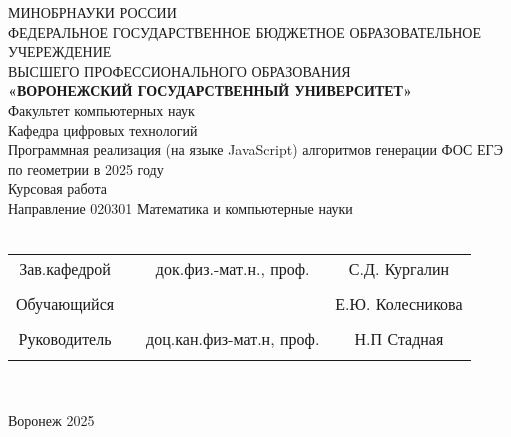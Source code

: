 
\begin{center}
	\hfill \break
	\large{МИНОБРНАУКИ РОССИИ}\\
	\footnotesize{ФЕДЕРАЛЬНОЕ ГОСУДАРСТВЕННОЕ БЮДЖЕТНОЕ ОБРАЗОВАТЕЛЬНОЕ УЧЕРЕЖДЕНИЕ}\\
	\footnotesize{ВЫСШЕГО ПРОФЕССИОНАЛЬНОГО ОБРАЗОВАНИЯ}\\
	\small{\textbf{«ВОРОНЕЖСКИЙ ГОСУДАРСТВЕННЫЙ УНИВЕРСИТЕТ»}}\\
	\hfill \break
	\normalsize{Факультет компьютерных наук}\\
	\hfill \break
	\normalsize{Кафедра цифровых технологий}\\
	\hfill\break
	\hfill \break
	\hfill \break
	\hfill \break
	\large{Программная реализация (на языке JavaScript) алгоритмов генерации ФОС ЕГЭ по геометрии в 2025 году}\\
	\hfill \break
	\hfill \break
	\hfill \break
	\hfill \break
	\hfill \break
	\normalsize{Курсовая работа\\
		\hfill \break
		Направление  020301 Математика и компьютерные науки\\

		\hfill \break
	}\\
	\hfill \break
	\hfill \break
\end{center}
\hfill \break

\normalsize{
	\begin{tabular}{cccc}
		Зав.кафедрой & \underline{\hspace{3cm}} & док.физ.-мат.н.,  проф. & С.Д. Кургалин    \\\\
		Обучающийся  & \underline{\hspace{3cm}} &                       & Е.Ю. Колесникова \\\\
		Руководитель & \underline{\hspace{3cm}} & доц.кан.физ-мат.н,  проф. & Н.П Стадная    \\\\
	\end{tabular}
}\\
\hfill \break
\hfill \break
\begin{center} Воронеж 2025 \end{center}
\thispagestyle{empty} %

